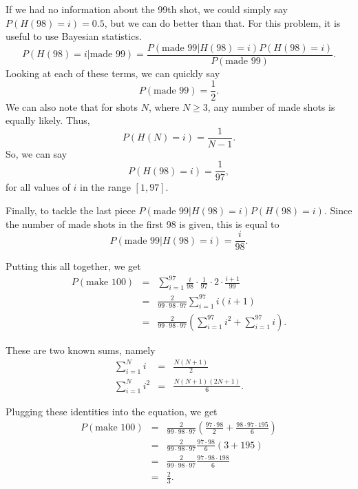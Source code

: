 \documentclass[12]{article}
\begin{document}
If we had no information about the 99th shot, we could simply say
$P\left(H\left(98\right)=i\right)=0.5$, but we can do better than that.
For this problem, it is useful to use Bayesian statistics.
\begin{equation}
  P(H(98)=i | \text{made 99}) =
  \frac{P(\text{made 99} | H(98)=i) P(H(98)=i)}{P(\text{made 99})}.
\end{equation}
Looking at each of these terms, we can quickly say
\begin{equation}
  P(\text{made 99}) = \frac{1}{2}.
\end{equation}
We can also note that for shots $N$, where $N \geq 3$, any number of made shots
is equally likely.
Thus,
\begin{equation}
  P(H(N)=i) = \frac{1}{N-1}.
\end{equation}
So, we can say
\begin{equation}
  P(H(98)=i) = \frac{1}{97},
\end{equation}
for all values of $i$ in the range $[1,97]$.

Finally, to tackle the last piece $P(\text{made 99} | H(98)=i) P(H(98)=i)$.
Since the number of made shots in the first 98 is given, this is equal to
\begin{equation}
  P(\text{made 99} | H(98)=i) = \frac{i}{98}.
\end{equation}

Putting this all together, we get
\begin{eqnarray}
  P(\text{make 100})
  & = &
  \sum_{i=1}^{97}\frac{i}{98} \cdot \frac{1}{97} \cdot 2 \cdot \frac{i+1}{99} \\
  & = &
  \frac{2}{99\cdot98\cdot97} \sum_{i=1}^{97}i(i+1) \\
  & = &
  \frac{2}{99\cdot98\cdot97}\left(\sum_{i=1}^{97}i^2 + \sum_{i=1}^{97}i \right).
\end{eqnarray}

These are two known sums, namely
\begin{eqnarray}
  \sum_{i=1}^{N} i & = & \frac{N(N+1)}{2} \\
  \sum_{i=1}^{N} i^2 & = & \frac{N(N+1)(2N+1)}{6}.
\end{eqnarray}

Plugging these identities into the equation, we get
\begin{eqnarray}
  P(\text{make 100})
  & = &
  \frac{2}{99\cdot98\cdot97}
  \left(\frac{97\cdot98}{2} + \frac{98\cdot97\cdot195}{6} \right) \\
  & = &
  \frac{2}{99\cdot98\cdot97} \frac{97\cdot98}{6} \left(3 + 195\right) \\
  & = &
  \frac{2}{99\cdot98\cdot97} \frac{97\cdot98\cdot198}{6} \\
  & = &
  \frac{2}{3}.
\end{eqnarray}
\end{document}
